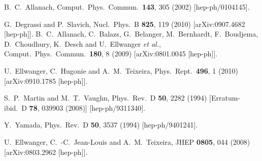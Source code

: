 \documentclass[final,3p,times,pdflatex]{elsarticle}
\begin{document}
\begin{thebibliography}{10}
  B.~C.~Allanach,
  Comput.\ Phys.\ Commun.\  {\bf 143}, 305 (2002)
  [hep-ph/0104145].

  G.~Degrassi and P.~Slavich,
  Nucl.\ Phys.\ B {\bf 825}, 119 (2010)
  [arXiv:0907.4682 [hep-ph]].
  B.~C.~Allanach, C.~Balazs, G.~Belanger, M.~Bernhardt, F.~Boudjema, D.~Choudhury, K.~Desch and U.~Ellwanger {\it et al.},
  Comput.\ Phys.\ Commun.\  {\bf 180}, 8 (2009)
  [arXiv:0801.0045 [hep-ph]].

  U.~Ellwanger, C.~Hugonie and A.~M.~Teixeira,
  Phys.\ Rept.\  {\bf 496}, 1 (2010)
  [arXiv:0910.1785 [hep-ph]].

  S.~P.~Martin and M.~T.~Vaughn,
  Phys.\ Rev.\ D {\bf 50}, 2282 (1994)
  [Erratum-ibid.\ D {\bf 78}, 039903 (2008)]
  [hep-ph/9311340].

  Y.~Yamada,
  Phys.\ Rev.\ D {\bf 50}, 3537 (1994)
  [hep-ph/9401241].

  U.~Ellwanger, C.~-C.~Jean-Louis and A.~M.~Teixeira,
  JHEP {\bf 0805}, 044 (2008)
  [arXiv:0803.2962 [hep-ph]].


\end{thebibliography}
\end{document}
